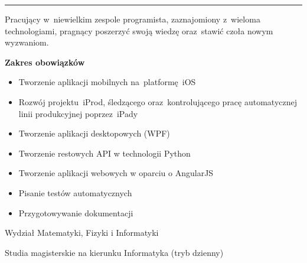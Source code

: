 \documentclass[11pt,a4paper]{article}
\begin{document}
    \noindent\rule{\textwidth}{0.4pt}
  
  
    \vspace{0.4cm}
  
    \smallskip
    \noindent
    Pracujący w~niewielkim zespole programista, zaznajomiony z~wieloma technologiami, pragnący poszerzyć swoją wiedzę oraz~stawić czoła nowym wyzwaniom.
  

    \vspace{0.5cm}

    \medskip
    \vspace{-1.6mm}
    \begin{description} \itemsep0pt \parskip0pt 
        \item[ ] {\bf Zakres obowiązków}
        \begin{itemize} \itemsep2pt \parskip0pt 
            \item Tworzenie aplikacji mobilnych na~platformę~iOS
            \item Rozwój projektu~iProd, śledzącego oraz~kontrolującego pracę automatycznej linii produkcyjnej poprzez~iPady
            \item Tworzenie aplikacji desktopowych (WPF)
            \item Tworzenie restowych API w technologii Python
            \item Tworzenie aplikacji webowych w oparciu o AngularJS
            \item Pisanie testów automatycznych
            \item Przygotowywanie dokumentacji
        \end{itemize}
    \end{description}

  
    \vspace{0.3cm}
  
    \medskip
    \vspace{-1.6mm}
    \begin{description} \itemsep0pt \parskip0pt 
        \item[ ] Wydział Matematyki, Fizyki i Informatyki
        \item[ ] Studia magisterskie na kierunku Informatyka (tryb dzienny)
    \end{description}
  
\end{document}
